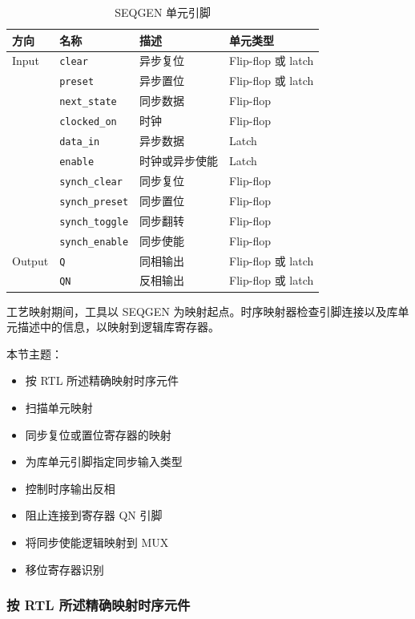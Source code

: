 \begin{table}[htbp]
\centering
\caption{SEQGEN 单元引脚}
\label{tab:seqgen-pins}
\small
\begin{tabularx}{\textwidth}{@{}l l X l@{}}
\toprule
\textbf{方向} & \textbf{名称} & \textbf{描述} & \textbf{单元类型} \\
\midrule
Input & \texttt{clear} & 异步复位 & Flip-flop 或 latch \\
 & \texttt{preset} & 异步置位 & Flip-flop 或 latch \\
 & \texttt{next\_state} & 同步数据 & Flip-flop \\
 & \texttt{clocked\_on} & 时钟 & Flip-flop \\
 & \texttt{data\_in} & 异步数据 & Latch \\
 & \texttt{enable} & 时钟或异步使能 & Latch \\
 & \texttt{synch\_clear} & 同步复位 & Flip-flop \\
 & \texttt{synch\_preset} & 同步置位 & Flip-flop \\
 & \texttt{synch\_toggle} & 同步翻转 & Flip-flop \\
 & \texttt{synch\_enable} & 同步使能 & Flip-flop \\
Output & \texttt{Q} & 同相输出 & Flip-flop 或 latch \\
 & \texttt{QN} & 反相输出 & Flip-flop 或 latch \\
\bottomrule
\end{tabularx}
\end{table}

工艺映射期间，工具以 SEQGEN 为映射起点。时序映射器检查引脚连接以及库单元描述中的信息，以映射到逻辑库寄存器。

本节主题：
\begin{itemize}
  \item 按 RTL 所述精确映射时序元件
  \item 扫描单元映射
  \item 同步复位或置位寄存器的映射
  \item 为库单元引脚指定同步输入类型
  \item 控制时序输出反相
  \item 阻止连接到寄存器 QN 引脚
  \item 将同步使能逻辑映射到 MUX
  \item 移位寄存器识别
\end{itemize}

\subsubsection{按 RTL 所述精确映射时序元件}
